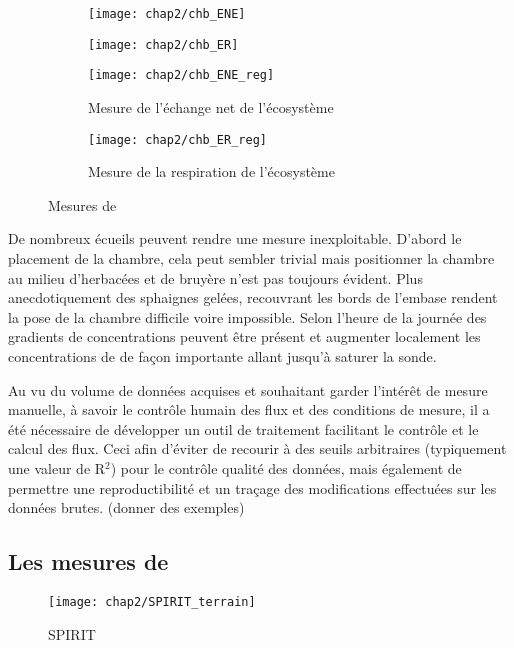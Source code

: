 \begin{figure}
	\centering
	\begin{subfigure}[t]{0.5\textwidth}
		\centering
		\texttt{[image: chap2/chb\_ENE]}
	\end{subfigure}%
	\begin{subfigure}[t]{0.5\textwidth}
		\centering
		\texttt{[image: chap2/chb\_ER]}
	\end{subfigure}%

	\begin{subfigure}[t]{0.5\textwidth}
		\texttt{[image: chap2/chb\_ENE\_reg]}
		\caption{Mesure de l'échange net de l'écosystème}
	\end{subfigure}%
	\begin{subfigure}[t]{0.5\textwidth}
		\texttt{[image: chap2/chb\_ER\_reg]}
		\caption{Mesure de la respiration de l'écosystème}
	\end{subfigure}
\caption{Mesures de \coo}
\label{fig:chb}
\end{figure}


De nombreux écueils peuvent rendre une mesure inexploitable. D'abord le placement de la chambre, cela peut sembler trivial mais positionner la chambre au milieu d'herbacées et de bruyère n'est pas toujours évident. Plus anecdotiquement des sphaignes gelées, recouvrant les bords de l'embase rendent la pose de la chambre difficile voire impossible. Selon l'heure de la journée des gradients de concentrations peuvent être présent et augmenter localement les concentrations de \coo de façon importante allant jusqu'à saturer la sonde.

Au vu du volume de données acquises et souhaitant garder l'intérêt de mesure manuelle, à savoir le contrôle humain des flux et des conditions de mesure, il a été nécessaire de développer un outil de traitement facilitant le contrôle et le calcul des flux.
Ceci afin d'éviter de recourir à des seuils arbitraires (typiquement une valeur de R$^{2}$) pour le contrôle qualité des données, mais également de permettre une reproductibilité et un traçage des modifications effectuées sur les données brutes.
(donner des exemples)

\subsection{Les mesures de \chh}

\begin{figure}
\texttt{[image: chap2/SPIRIT\_terrain]}
\caption{SPIRIT}
\label{fig:SPIRIT}
\end{figure}

